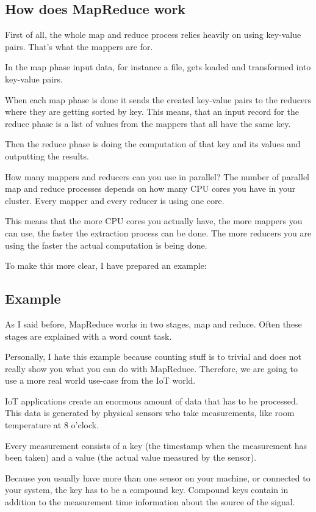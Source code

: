 \documentclass[12pt, numbers=noenddot]{scrreprt} %
\begin{document}
\subsection{How does MapReduce work}

First of all, the whole map and reduce process relies heavily on using key-value pairs. That’s what the mappers are for.

In the map phase input data, for instance a file, gets loaded and transformed into key-value pairs.

When each map phase is done it sends the created key-value pairs to the reducers where they are getting sorted by key. This means, that an input record for the reduce phase is a list of values from the mappers that all have the same key.

Then the reduce phase is doing the computation of that key and its values and outputting the results.

How many mappers and reducers can you use in parallel? The number of parallel map and reduce processes depends on how many CPU cores you have in your cluster. Every mapper and every reducer is using one core.

This means that the more CPU cores you actually have, the more mappers you can use, the faster the extraction process can be done. The more reducers you are using the faster the actual computation is being done.

To make this more clear, I have prepared an example:

\subsection{Example}
As I said before, MapReduce works in two stages, map and reduce. Often these stages are explained with a word count task.

Personally, I hate this example because counting stuff is to trivial and does not really show you what you can do with MapReduce. Therefore, we are going to use a more real world use-case from the IoT world.

IoT applications create an enormous amount of data that has to be processed. This data is generated by physical sensors who take measurements, like room temperature at 8 o’clock.

Every measurement consists of a key (the timestamp when the measurement has been taken) and a value (the actual value measured by the sensor).

Because you usually have more than one sensor on your machine, or connected to your system, the key has to be a compound key. Compound keys contain in addition to the measurement time information about the source of the signal.
\end{document}
